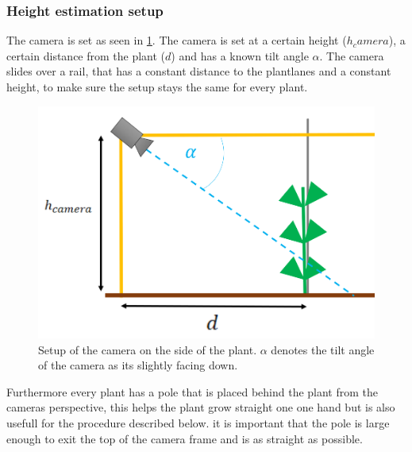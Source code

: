 \subsubsection{Height estimation setup}
The camera  is set as seen in \ref{fig:setupSide}. The camera is set at a certain height ($h_camera$), a certain distance from the plant ($d$) and has a known tilt angle $\alpha$. The camera slides over a rail, that has a constant distance to the plantlanes and a constant height, to make sure the setup stays the same for every plant.
   \begin{figure}[H]
       \centering
       \includegraphics[scale=0.6]{setupSide.PNG}
       \caption{Setup of the camera on the side of the plant. $\alpha$ denotes the tilt angle of the camera as its slightly facing down. }
       \label{fig:setupSide}
   \end{figure}
Furthermore every plant has a pole that is placed behind the plant from the cameras perspective, this helps the plant grow straight one one hand but is also usefull for the procedure described below. it is important that the pole is large enough to exit the top of the camera frame and is as straight as possible.
